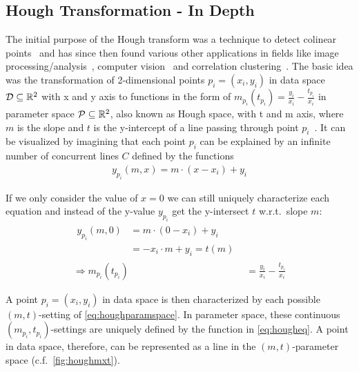 \subsection{Hough Transformation - In Depth}\label{ssec:houghindepth}
The initial purpose of the Hough transform was a technique to detect colinear points~\cite{houghOriginal1962method} and has since then found various other applications in fields like image processing/analysis~\cite{rosenfeld1969picture,ballard1981generalizing}, computer vision~\cite{davies2004machine} and correlation clustering~\cite{CASHachtert2008robust}.
The basic idea was the transformation of 2-dimensional points $p_i = (x_i,y_i)$ in data space $\mathcal{D} \subseteq \mathbb{R}^2$ with x and y axis to functions in the form of ${m_{p_i}(t_{p_i}) = \frac{y_i}{x_i} - \frac{t_{p_i}}{x_i}}$ in parameter space $\mathcal{P} \subseteq \mathbb{R}^2$, also known as Hough space, with t and m axis, where $m$ is the slope and $t$ is the y-intercept of a line passing through point $p_i$~\cite{illingworth1988survey}. It can be visualized by imagining that each point $p_i$ can be explained by an infinite number of concurrent lines $C$ defined by the functions 
\begin{align}
    {y_{p_i}(m,x) = m \cdot (x - x_i) + y_i}
\end{align}

If we only consider the value of $x=0$ we can still uniquely characterize each equation and instead of the y-value $y_{p_i}$ get the y-intersect $t$ w.r.t.\ slope $m$:
\begin{align}\label{eq:houghparamspace}
\begin{split}
y_{p_i}(m,0) 
&= m \cdot (0 - x_i) + y_i\\
&= -x_i \cdot m + y_i = t(m)
\end{split}\\
\label{eq:hougheq}
\Rightarrow m_{p_i}(t_{p_i}) &= \frac{y_i}{x_i} - \frac{t_{p_i}}{x_i}
\end{align}

A point $p_i = (x_i, y_i)$ in data space is then characterized by each possible $(m,t)$-setting of \autoref{eq:houghparamspace}. In parameter space, these continuous $(m_{p_i},t_{p_i})$-settings are uniquely defined by the function in \autoref{eq:hougheq}. A point in data space, therefore, can be represented as a line in the $(m,t)$-parameter space (c.f.\ \autoref{fig:houghmxt}).  %

